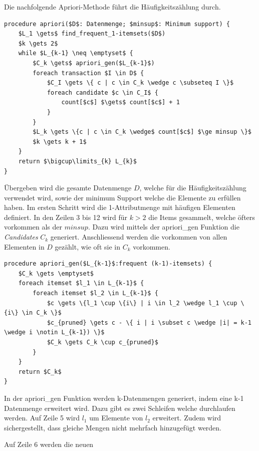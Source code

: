 Die nachfolgende Apriori-Methode führt die Häufigkeitszählung durch.
\begin{lstlisting}
procedure apriori($D$: Datenmenge; $minsup$: Minimum support) {
	$L_1 \gets$ find_frequent_1-itemsets($D$)
	$k \gets 2$
	while $L_{k-1} \neq \emptyset$ {
		$C_k \gets$ apriori_gen($L_{k-1}$)
		foreach transaction $I \in D$ {
			$C_I \gets \{ c | c \in C_k \wedge c \subseteq I \}$
			foreach candidate $c \in C_I$ {
				count[$c$] $\gets$ count[$c$] + 1
			}
		}
		$L_k \gets \{c | c \in C_k \wedge$ count[$c$] $\ge minsup \}$
		$k \gets k + 1$
	}
	return $\bigcup\limits_{k} L_{k}$
}
\end{lstlisting}
Übergeben wird die gesamte Datenmenge $D$, welche für die Häufigkeitszählung verwendet wird, sowie der minimum Support welche die Elemente zu erfüllen haben.
Im ersten Schritt wird die 1-Attributmenge mit häufigen Elementen definiert. In den Zeilen 3 bis 12 wird für $k > 2$ die Items gesammelt, welche öfters vorkommen als der $minsup$. Dazu wird mittels der apriori\_gen Funktion die \textit{Candidates} $C_k$ generiert.
Anschliessend werden die vorkommen von allen Elementen in $D$ gezählt, wie oft sie in $C_k$ vorkommen.


\begin{lstlisting}
procedure apriori_gen($L_{k-1}$:frequent (k-1)-itemsets) {
	$C_k \gets \emptyset$
	foreach itemset $l_1 \in L_{k-1}$ {
		foreach itemset $l_2 \in L_{k-1}$ {
			$c \gets \{l_1 \cup \{i\} | i \in l_2 \wedge l_1 \cup \{i\} \in C_k \}$
			$c_{pruned} \gets c - \{ i | i \subset c \wedge |i| = k-1 \wedge i \notin L_{k-1}) \}$
			$C_k \gets C_k \cup c_{pruned}$
		}
	}
	return $C_k$
}
\end{lstlisting}
In der apriori\_gen Funktion werden k-Datenmengen generiert, indem eine k-1 Datenmenge erweitert wird. Dazu gibt es zwei Schleifen welche durchlaufen werden. Auf Zeile 5 wird $l_1$ um Elemente von $l_2$ erweitert. Zudem wird sichergestellt, dass gleiche Mengen nicht mehrfach hinzugefügt werden.

Auf Zeile 6 werden die neuen

%
%
%
